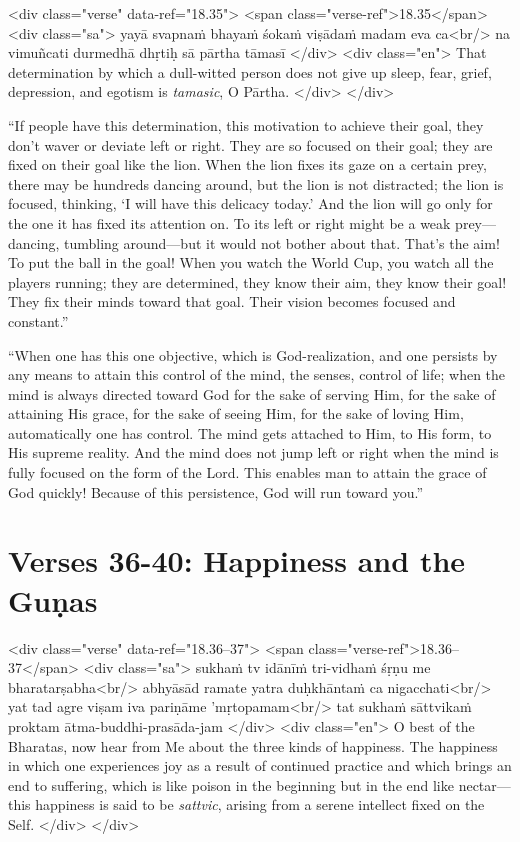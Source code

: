 \begin{html}
<div class="verse" data-ref="18.35">
  <span class="verse-ref">18.35</span>
  <div class="sa">
    yayā svapnaṁ bhayaṁ śokaṁ viṣādaṁ madam eva ca<br/>
    na vimuñcati durmedhā dhṛtiḥ sā pārtha tāmasī
  </div>
  <div class="en">
    That determination by which a dull-witted person does not give up sleep, fear, grief, depression, and egotism is \textit{tamasic}, O Pārtha.
  </div>
</div>
\end{html}


\enquote{If people have this determination, this motivation to achieve their goal, they don’t waver or deviate left or right. They are so focused on their goal; they are fixed on their goal like the lion. When the lion fixes its gaze on a certain prey, there may be hundreds dancing around, but the lion is not distracted; the lion is focused, thinking, \enquote{I will have this delicacy today.} And the lion will go only for the one it has fixed its attention on. To its left or right might be a weak prey---dancing, tumbling around---but it would not bother about that. That’s the aim! To put the ball in the goal! When you watch the World Cup, you watch all the players running; they are determined, they know their aim, they know their goal! They fix their minds toward that goal. Their vision becomes focused and constant.}

\enquote{When one has this one objective, which is God-realization, and one persists by any means to attain this control of the mind, the senses, control of life; when the mind is always directed toward God for the sake of serving Him, for the sake of attaining His grace, for the sake of seeing Him, for the sake of loving Him, automatically one has control. The mind gets attached to Him, to His form, to His supreme reality. And the mind does not jump left or right when the mind is fully focused on the form of the Lord. This enables man to attain the grace of God quickly! Because of this persistence, God will run toward you.}

\newpage
\section{Verses 36-40: Happiness and the Guṇas}\label{sec-verses-36-40-happiness-and-the-gunas}


\begin{html}
<div class="verse" data-ref="18.36–37">
  <span class="verse-ref">18.36–37</span>
  <div class="sa">
    sukhaṁ tv idānīṁ tri-vidhaṁ śṛṇu me bharatarṣabha<br/>
    abhyāsād ramate yatra duḥkhāntaṁ ca nigacchati<br/>
    yat tad agre viṣam iva pariṇāme ’mṛtopamam<br/>
    tat sukhaṁ sāttvikaṁ proktam ātma-buddhi-prasāda-jam
  </div>
  <div class="en">
    O best of the Bharatas, now hear from Me about the three kinds of happiness. The happiness in which one experiences joy as a result of continued practice and which brings an end to suffering, which is like poison in the beginning but in the end like nectar---this happiness is said to be \textit{sattvic}, arising from a serene intellect fixed on the Self.
  </div>
</div>
\end{html}



